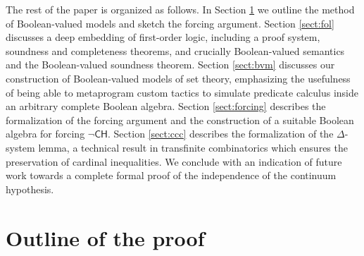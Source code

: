 \documentclass[a4paper,USenglish,cleveref, autoref]{lipics-v2019}
\begin{document}
The rest of the paper is organized as follows. In Section \ref{sect:outline} we outline the method of Boolean-valued models and sketch the forcing argument. Section \ref{sect:fol} discusses a deep embedding of first-order logic, including a proof system, soundness and completeness theorems, and crucially Boolean-valued semantics and the Boolean-valued soundness theorem. Section \ref{sect:bvm} discusses our construction of Boolean-valued models of set theory, emphasizing the usefulness of being able to metaprogram custom tactics to simulate predicate calculus inside an arbitrary complete Boolean algebra. Section \ref{sect:forcing} describes the formalization of the forcing argument and the construction of a suitable Boolean algebra for forcing $\neg\mathsf{CH}$. Section \ref{sect:ccc} describes the formalization of the $\Delta$-system lemma, a technical result in transfinite combinatorics which ensures the preservation of cardinal inequalities. We conclude with an indication of future work towards a complete formal proof of the independence of the continuum hypothesis.
\section{Outline of the proof}
\label{sect:outline}




\end{document}

